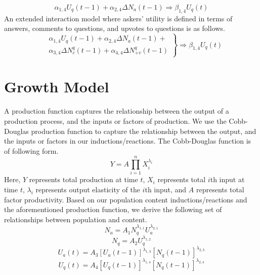 \begin{equation*}
\alpha_{1, 4} U_q(t-1) + \alpha_{2, 4} \Delta N_a(t-1) \Longrightarrow \beta_{1, 4} U_q(t)
\end{equation*}
\noindent An extended interaction model where askers' utility is defined in terms of answers, comments to questions, and upvotes to questions is as follows.    
\begin{equation*}
\left.
\begin{aligned}
& \alpha_{1, 4} U_q(t-1) + \alpha_{2, 4} \Delta N_a(t-1) +\\
& \alpha_{3, 4} \Delta N_c^q(t-1) + \alpha_{4, 4} \Delta N_{+v}^q(t-1)
\end{aligned}
\right\}
\Longrightarrow \beta_{1, 4} U_q(t)
\end{equation*}

\section{Growth Model}
A production function captures the relationship between the output of a production process, and the inputs or factors of production. We use the Cobb-Douglas production function to capture the relationship between the output, and the inputs or factors in our inductions/reactions. The Cobb-Douglas function is of following form.
\begin{equation*}
Y = A\prod_{i=1}^{n} X_i^{\lambda_i}
\end{equation*} 
\noindent Here, $Y$ represents total production at time $t$, $X_i$ represents total $i$th input at time $t$, $\lambda_i$ represents output elasticity of the $i$th input, and $A$ represents total factor productivity. Based on our population content inductions/reactions and the aforementioned production function, we derive the following set of relationships between population and content. 
\begin{equation}
N_a = A_1 N_q^{\lambda_{1, 1}} U_a^{\lambda_{2, 1}}
\end{equation}
\begin{equation}
N_q = A_2 U_q^{\lambda_{1, 2}}
\end{equation}
\begin{equation}
U_a(t) = A_3 [U_a(t-1)]^{\lambda_{1, 3}} [N_q(t-1)]^{\lambda_{2, 3}}
\end{equation}
\begin{equation}
U_q(t) = A_4 [U_q(t-1)]^{\lambda_{1, 4}} [N_q(t-1)]^{\lambda_{2, 4}} 
\end{equation}
